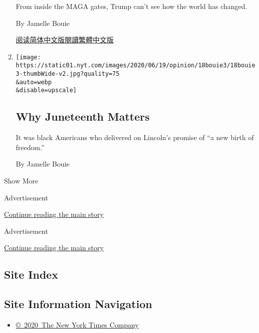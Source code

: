 \begin{enumerate}
  From inside the MAGA gates, Trump can't see how the world has changed.

  By Jamelle Bouie

  \href{https://cn.nytimes.com/opinion/20200624/maga-trump-fake-news/}{阅读简体中文版}\href{https://cn.nytimes.com/opinion/20200624/maga-trump-fake-news/zh-hant/}{閱讀繁體中文版}
\item
  \href{/2020/06/18/opinion/juneteenth-slavery-freedom.html}{}

  \texttt{[image: https://static01.nyt.com/images/2020/06/19/opinion/18bouie3/18bouie3-thumbWide-v2.jpg?quality=75\\\&auto=webp\\\&disable=upscale]}

  \hypertarget{why-juneteenth-matters}{%
  \subsection{Why Juneteenth Matters}\label{why-juneteenth-matters}}

  It was black Americans who delivered on Lincoln's promise of ``a new
  birth of freedom.''

  By Jamelle Bouie
\end{enumerate}

Show More

Advertisement

\protect\hyperlink{after-mid1}{Continue reading the main story}

Advertisement

\protect\hyperlink{after-mktg}{Continue reading the main story}

\hypertarget{site-index}{%
\subsection{Site Index}\label{site-index}}

\hypertarget{site-information-navigation}{%
\subsection{Site Information
Navigation}\label{site-information-navigation}}

\begin{itemize}
\tightlist
\item
  \href{https://help.nytimes.com/hc/en-us/articles/115014792127-Copyright-notice}{©~2020~The
  New York Times Company}
\end{itemize}

